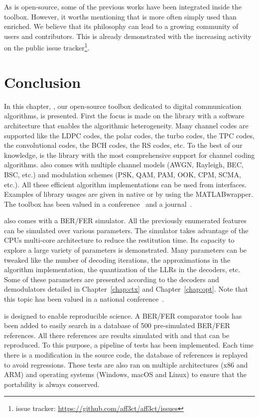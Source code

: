 As \AFFECT is open-source, some of the previous works have been integrated
inside the toolbox. However, it worths mentioning that \AFFECT is more often
simply used than enriched. We believe that its philosophy can lead to a growing
community of users and contributors. This is already demonstrated with the
increasing activity on the public issue tracker\footnote{\AFFECT issue tracker:
\url{https://github.com/aff3ct/aff3ct/issues}}.

\section{Conclusion}

In this chapter, \AFFECT, our open-source toolbox dedicated to digital
communication algorithms, is presented. First the focus is made on the library
with a software architecture that enables the algorithmic heterogeneity. Many
channel codes are supported like the LDPC codes, the polar codes, the turbo
codes, the TPC codes, the convolutional codes, the BCH codes, the RS codes, etc.
To the best of our knowledge, \AFFECT is the library with the most comprehensive
support for channel coding algorithms. \AFFECT also comes with multiple channel
models (AWGN, Rayleigh, BEC, BSC, etc.) and modulation schemes (PSK, QAM, PAM,
OOK, CPM, SCMA, etc.). All these efficient algorithm implementations can be
used from interfaces. Examples of library usages are given in native \Cxx or
by using the MATLAB\R wrapper. The \AFFECT toolbox has been valued in a
conference~\cite{Cassagne2017a} and a journal~\cite{Cassagne2019a}.

\AFFECT also comes with a BER/FER simulator. All the previously enumerated
features can be simulated over various parameters. The simulator takes advantage
of the CPUs multi-core architecture to reduce the restitution time. Its capacity
to explore a large variety of parameters is demonstrated. Many parameters can be
tweaked like the number of decoding iterations, the approximations in the
algorithm implementation, the quantization of the LLRs in the decoders, etc.
Some of these parameters are presented according to the decoders and
demodulators detailed in Chapter~\ref{chap:ctx} and Chapter~\ref{chap:opt}. Note
that this topic has been valued in a national conference~\cite{Cassagne2017}.

\AFFECT is designed to enable reproducible science. A BER/FER comparator tools
has been added to easily search in a database of 500 pre-simulated BER/FER
references. All there references are results simulated with \AFFECT and that can
be reproduced. To this purpose, a pipeline of tests has been implemented. Each
time there is a modification in the source code, the database of references is
replayed to avoid regressions. These tests are also ran on multiple
architectures (x86 and ARM\R) and operating systems (Windows, macOS and Linux)
to ensure that the portability is always conserved.


